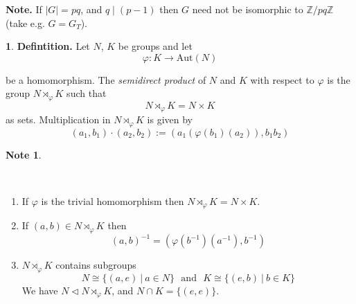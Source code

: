 \documentclass[12pt, letterpaper, oneside]{article}
\theoremstyle{plain}
\theoremstyle{definition}
\newtheorem{note}[theorem]{Note}
\newtheorem{nn}[theorem]{}
\newcommand{\Z}{{\mathbb Z}}
\newcommand{\Aut}{\mathrm{Aut}}
\newcommand{\benu}{\begin{enumerate}}
\newcommand{\eenu}{\end{enumerate}}
\newcommand{\vs}{\vskip 5mm}
\newcommand{\isep}[1][0]{\setlength{\itemsep}{#1 mm}}
\begin{document}
\vs

\textbf{Note.} If $|G|= pq$, and $q \mid (p-1)$ then $G$ need not be isomorphic to $\Z/pq\Z$
(take e.g. $G= G_{T}$).

\vs\vs

\begin{nn} \textbf{Defintition.}
Let $N$, $K$ be groups and let 
$$\varphi \colon K \to \Aut(N)$$

\vskip -6mm


be a homomorphism. The \emph{semidirect product} of $N$ and $K$ with respect to $\varphi$
is the group $N \rtimes_{\varphi} K$ such that 
$$N \rtimes_{\varphi} K = N\times K$$
as sets. Multiplication in $N \rtimes_{\varphi} K$ is given by 
$$(a_{1}, b_{1})\cdot (a_{2}, b_{2}) := (a_{1}(\varphi(b_{1})(a_{2})), b_{1}b_{2})$$
\end{nn}


\vs\vs 


\newpage

\begin{note}\ 

\vskip -13mm


\ 
\benu
\isep[3]

\item If $\varphi$ is the trivial homomorphism then $ N \rtimes_{\varphi} K = N\times K$.


\item If $(a, b)\in N \rtimes_{\varphi} K$ then 
$$(a, b)^{-1} = (\varphi(b^{-1})(a^{-1}) , b^{-1})$$

\item   $N \rtimes_{\varphi} K$ contains subgroups
$$N\cong \{(a, e)  \ | \ a\in N \}  \ \ \ \text{and} \ \ \ K\cong \{ (e, b) \ | \ b\in K \} $$
We have $N \lhd  N \rtimes_{\varphi} K$,  and $N\cap K = \{(e, e)\}$.


\eenu
\end{note}

\vs\vs
\end{document}
